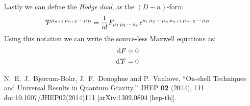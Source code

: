 \documentclass[a4paper,12pt]{article}
\begin{document}
Lastly we can define the \textit{Hodge dual}, as the $(D-n)$-form
\begin{equation}
^{*}\hspace*{-0.1cm}F^{\mu_{n+1}\,\mu_{n+2}\,\cdots\,\mu_{D}}=\frac{1}{n!}F_{\mu_1\,\mu_2\,\cdots\,\mu_n}\epsilon^{\mu_1\,\mu_2\,\cdots\,\mu_n\,\mu_{n+1}\,\mu_{n+2}\,\cdots\,\mu_D}
\end{equation}
Using this notation we can write the source-less Maxwell equations as:
\begin{equation}
\begin{aligned}
\dd F&=0\\
\dd \hodge F&=0
\end{aligned}
\end{equation}
\newpage
\begin{thebibliography}{99}

N.~E.~J.~Bjerrum-Bohr, J.~F.~Donoghue and P.~Vanhove,
``On-shell Techniques and Universal Results in Quantum Gravity,''
JHEP \textbf{02} (2014), 111
doi:10.1007/JHEP02(2014)111
[arXiv:1309.0804 [hep-th]].

\end{thebibliography}
\end{document}
